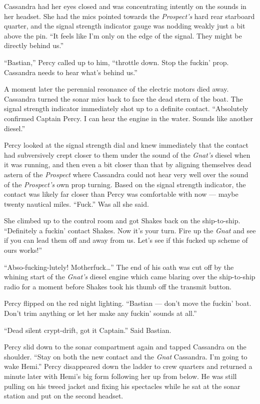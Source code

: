 \documentclass[]{scrbook}
\begin{document}
Cassandra had her eyes closed and was concentrating intently on the
sounds in her headset. She had the mics pointed towards the
\emph{Prospect's} hard rear starboard quarter, and the signal strength
indicator gauge was nodding weakly just a bit above the pin. ``It feels
like I'm only on the edge of the signal. They might be directly behind
us.''

``Bastian,'' Percy called up to him, ``throttle down. Stop the fuckin'
prop. Cassandra needs to hear what's behind us.''

A moment later the perennial resonance of the electric motors died away.
Cassandra turned the sonar mics back to face the dead stern of the boat.
The signal strength indicator immediately shot up to a definite contact.
``Absolutely confirmed Captain Percy. I can hear the engine in the
water. Sounds like another diesel.''

Percy looked at the signal strength dial and knew immediately that the
contact had subversively crept closer to them under the sound of the
\emph{Gnat's} diesel when it was running, and then even a bit closer
than that by aligning themselves dead astern of the \emph{Prospect}
where Cassandra could not hear very well over the sound of the
\emph{Prospect's} own prop turning. Based on the signal strength
indicator, the contact was likely far closer than Percy was comfortable
with now --- maybe twenty nautical miles. ``Fuck.'' Was all she said.

She climbed up to the control room and got Shakes back on the
ship-to-ship. ``Definitely a fuckin' contact Shakes. Now it's your turn.
Fire up the \emph{Gnat} and see if you can lead them off and away from
us. Let's see if this fucked up scheme of ours works!''

``Abso-fucking-lutely! Motherfuck\ldots{}'' The end of his oath was cut
off by the whining start of the \emph{Gnat's} diesel engine which came
blaring over the ship-to-ship radio for a moment before Shakes took his
thumb off the transmit button.

Percy flipped on the red night lighting. ``Bastian --- don't move the
fuckin' boat. Don't trim anything or let her make any fuckin' sounds at
all.''

``Dead silent crypt-drift, got it Captain.'' Said Bastian.

Percy slid down to the sonar compartment again and tapped Cassandra on
the shoulder. ``Stay on both the new contact and the \emph{Gnat}
Cassandra. I'm going to wake Hemi.'' Percy disappeared down the ladder
to crew quarters and returned a minute later with Hemi's big form
following her up from below. He was still pulling on his tweed jacket
and fixing his spectacles while he sat at the sonar station and put on
the second headset.
\end{document}
